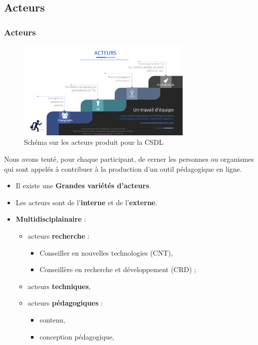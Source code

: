 		 \subsection{Acteurs} 
					\begin{frame}[allowframebreaks]
						\frametitle{Acteurs}
                        			\begin{figure}
                     			\centering
                    			 \includegraphics[width = 0.75\textwidth]{acteurs.png}
                     			\caption{\tiny{Schéma sur les acteurs produit pour la CSDL}}
                   			\end{figure}
                        			Nous avons tenté, pour chaque participant, de cerner les personnes ou organismes qui sont appelés à contribuer à la production d’un outil pédagogique en ligne.
							\begin{itemize}
							\item Il existe une \textbf{Grandes variétés d'acteurs}.
							\item Les acteurs sont de l'\textbf{interne} et de l'\textbf{externe}.
							\item \textbf{Multidisciplainaire} :
								\begin{itemize}
								\item acteurs \textbf{recherche} : 
									\begin{itemize}
									\item Conseiller en nouvelles technologies (CNT),
									\item Conseillère en recherche et développement (CRD) ;
									\end{itemize}
								\item acteurs\textbf{ techniques},												
								\framebreak
								\item acteurs \textbf{pédagogiques} :
									\begin{itemize}
									\item contenu,
									\item conception pédagogique,

\end{itemize}
\end{itemize}
\end{itemize}
\end{frame}
